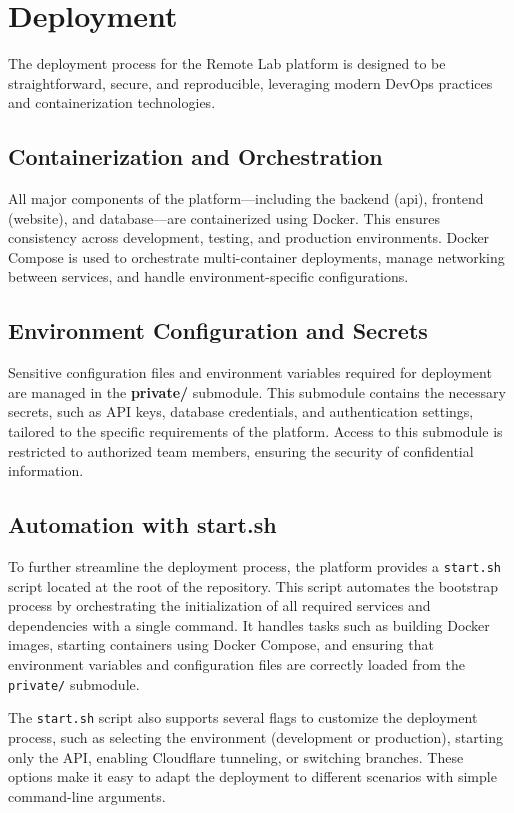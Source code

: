 \section{Deployment}

The deployment process for the Remote Lab platform is designed to be straightforward, secure, and reproducible, leveraging modern DevOps practices and containerization technologies.

\subsection{Containerization and Orchestration}
All major components of the platform—including the backend (api), frontend (website), and database—are containerized using Docker. This ensures consistency across development, testing, and production environments. Docker Compose is used to orchestrate multi-container deployments, manage networking between services, and handle environment-specific configurations.

\subsection{Environment Configuration and Secrets}
Sensitive configuration files and environment variables required for deployment are managed in the \textbf{private/} submodule. This submodule contains the necessary secrets, such as API keys, database credentials, and authentication settings, tailored to the specific requirements of the platform. Access to this submodule is restricted to authorized team members, ensuring the security of confidential information.

\subsection{Automation with start.sh}

To further streamline the deployment process, the platform provides a \texttt{start.sh} script located at the root of the repository. This script automates the bootstrap process by orchestrating the initialization of all required services and dependencies with a single command. It handles tasks such as building Docker images, starting containers using Docker Compose, and ensuring that environment variables and configuration files are correctly loaded from the \texttt{private/} submodule.

The \texttt{start.sh} script also supports several flags to customize the deployment process, such as selecting the environment (development or production), starting only the API, enabling Cloudflare tunneling, or switching branches. These options make it easy to adapt the deployment to different scenarios with simple command-line arguments.

